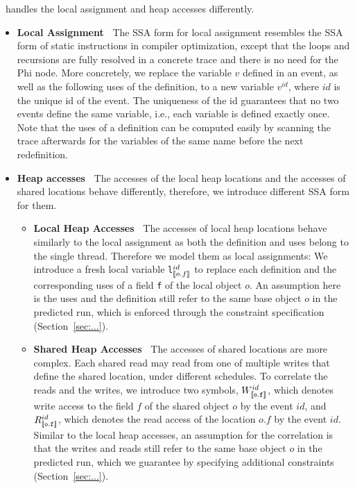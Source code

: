 \tool\ handles the local assignment and heap accesses differently.
\begin{itemize}
\item {\bf Local Assignment\ } The SSA form for local assignment resembles the SSA form of static instructions in compiler optimization, except that the loops and recursions are fully resolved in a concrete trace and there is no need for the Phi node. More concretely, we replace the variable $v$ defined in an event, as well as the following uses of the definition, to a new variable $v^{id}$, where $id$ is the unique id of the event. The uniqueness of the id guarantees that no two events define the same variable, i.e., each variable is defined exactly once. Note that the uses of a definition can be computed easily by scanning the trace afterwards for the variables of the same name before the next redefinition. 
\item {\bf Heap accesses\ } The accesses of the local heap locations and the accesses of shared locations behave differently, therefore, we introduce different SSA form for them. 
\begin{itemize}
\item {\bf Local Heap Accesses\ } The accesses of local heap locations behave similarly to the local assignment as both the definition and uses belong to the single thread. Therefore we model them as local assignments: We introduce a fresh local variable {\tt l$_{\lbrack\!\lbrack o.f \rbrack\!\rbrack}^{id}$} to replace each definition and  the corresponding uses of a  field {\tt f} of the local object $o$. An assumption here is the uses and the definition still refer to the same base object $o$ in the predicted run, which is enforced through the constraint specification (Section~\ref{sec:...}).
\item  {\bf Shared Heap Accesses\ } The accesses of shared locations are more complex. Each shared read may read from one of multiple writes that define the shared location, under different schedules.     To correlate the reads and the writes, we introduce two symbols, $W^{id}_{\tt \lbrack\!\lbrack o.f\rbrack\!\rbrack }$, which denotes write access to 
the field $f$ of the shared object $o$ by the event $id$, and $R^{id}_{\tt \lbrack\!\lbrack o.f\rbrack\!\rbrack }$,  which denotes the read access of the location $o.f$ by the event $id$. 
Similar to the local heap accesses, an assumption for the correlation is that the writes and reads still refer to the same base object $o$ in the predicted run, which we guarantee by specifying additional constraints (Section~\ref{sec:...}). 
\end{itemize}
\end{itemize}

